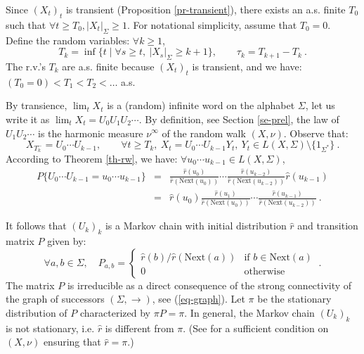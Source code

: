 \documentclass[11pt,a4paper]{article}
\theoremstyle{remark}
\def\rig{\text{Next}}
\def\eref#1{(\ref{#1})}
\begin{document}
\medskip

Since $(X_t)_t$ is transient (Proposition \ref{pr-transient}),
there exists an a.s. finite $T_0$ such that $\forall t \geq T_0,
|X_t|_{\Sigma}\geq 1$. For notational simplicity, assume that
$T_0=0$. Define the random variables: $\forall k \geq 1$,
\begin{equation}
T_k = \inf \bigl\{ t \mid \forall s\geq t, \ |X_s|_{\Sigma} \geq
k+1 \bigr\}, \qquad \tau_k = T_{k+1}-T_k \:.
\end{equation}
The r.v.'s $T_k$ are a.s. finite because $(X_t)_t$ is transient, and we
have:
$(T_0=0)< T_1<T_2 < \dots$ a.s.

By transience, $\lim_t X_t$ is a (random) infinite word on the
alphabet $\Sigma$, let us write it as $\lim_t X_t
=U_0U_1U_2\cdots$.
By definition, see Section
\ref{se-prel}, the law of $U_1U_2\cdots$ is the harmonic measure
$\nu^{\infty}$ of the random walk $(X,\nu)$. Observe that:
\[
X_{T_k^-} = U_0\cdots U_{k-1}, \qquad \forall t \geq T_k, \ X_t =
U_0\cdots U_{k-1} Y_t, \ Y_t \in L(X,\Sigma) \setminus
\{1_{\Sigma^*}\} \:.
\]
According to Theorem
\ref{th-rw}, we have: $\forall u_0\cdots u_{k-1} \in L(X,\Sigma)$,
\begin{eqnarray}
P\{U_0\cdots U_{k-1} =u_0\cdots u_{k-1}\} &  = &
\frac{\widehat{r}(u_0)}{\widehat{r}(\rig(u_0))}\cdots
\frac{\widehat{r}(u_{k-2})}{\widehat{r}(\rig(u_{k-2}))}
\widehat{r}(u_{k-1}) \nonumber \\
&  = & \widehat{r}(u_0) \frac{\widehat{r}(u_1)}{\widehat{r}(\rig(u_0))} \cdots
\frac{\widehat{r}(u_{k-1})}{\widehat{r}(\rig(u_{k-2}))} \label{eq-lawU} \:.
\end{eqnarray}

It follows that $(U_k)_k$ is a Markov chain with initial distribution
$\widehat{r}$ and transition matrix $P$ given by:
\begin{equation*}\label{eq-transi}
\forall a,b \in \Sigma, \quad P_{a,b}=\begin{cases}
\widehat{r}(b)/\widehat{r}(\rig(a)) &
                      \text{if } b\in \rig(a) \\
                      0    & \text{otherwise }
\end{cases}\:.
\end{equation*}
The matrix $P$ is irreducible as a direct consequence of the
strong connectivity of the graph of successors $(\Sigma,\rightarrow)$, see
\eref{eq-graph}. 
Let $\pi$ be the stationary
distribution of $P$ characterized by $\pi P=\pi$. In general, the
Markov chain $(U_k)_k$ is not stationary, i.e. $\widehat{r}$ is
different from $\pi$. (See \cite[Proposition 3.6]{MaMa} for a
sufficient condition on $(X,\nu)$ ensuring that
$\widehat{r}=\pi$.)
\end{document}
